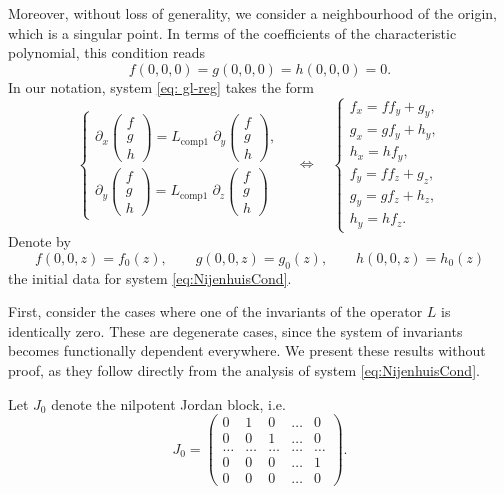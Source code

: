 \documentclass[12pt]{article}
\theoremstyle{plain}
\begin{document}
Moreover, without loss of generality, we consider a neighbourhood of the origin, which is a singular point. In terms of the coefficients of the characteristic polynomial, this condition reads
\[
f(0,0,0)=g(0,0,0)=h(0,0,0)=0.
\]
In our notation, system \eqref{eq: gl-reg} takes the form
\begin{equation}\label{eq:NijenhuisCond}
    \begin{cases}
        \partial_x \begin{pmatrix} f \\ g \\ h \end{pmatrix}
        = L_{\operatorname{comp1}} \; \partial_y \begin{pmatrix} f \\ g \\ h \end{pmatrix},
        \\[2ex]
        \partial_y \begin{pmatrix} f \\ g \\ h \end{pmatrix}
        = L_{\operatorname{comp1}} \; \partial_z \begin{pmatrix} f \\ g \\ h \end{pmatrix}
    \end{cases}
    \quad\Longleftrightarrow\quad
    \begin{cases}
        f_x = f f_y + g_y,\\
        g_x = g f_y + h_y,\\
        h_x = h f_y,\\[2ex]
        f_y = f f_z + g_z,\\
        g_y = g f_z + h_z,\\
        h_y = h f_z.
    \end{cases}
\end{equation}
Denote by
\[
f(0,0,z)=f_0(z), \qquad
g(0,0,z)=g_0(z), \qquad
h(0,0,z)=h_0(z)
\]
the initial data for system \eqref{eq:NijenhuisCond}.

First, consider the cases where one of the invariants of the operator $L$ is identically zero. These are degenerate cases, since the system of invariants becomes functionally dependent everywhere. We present these results without proof, as they follow directly from the analysis of system \eqref{eq:NijenhuisCond}.

Let $J_0$ denote the nilpotent Jordan block, i.e.
\[
J_0 = \begin{pmatrix}
    0 & 1 & 0 & \ldots & 0 \\
    0 & 0 & 1 & \ldots & 0 \\
    \ldots & \ldots & \ldots & \ldots & \ldots \\
    0 & 0 & 0 & \ldots & 1 \\
    0 & 0 & 0 & \ldots & 0
\end{pmatrix}.
\]
\end{document}
